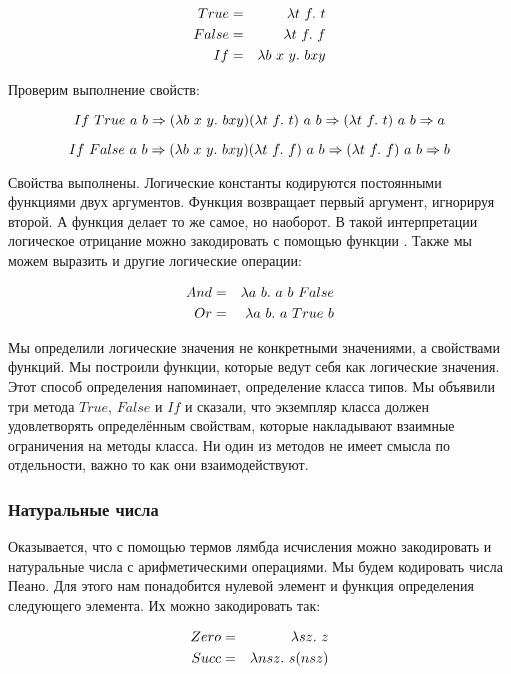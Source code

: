 \begin{eqnarray*}
True  &=& \lambda t\ f .\  t \\
False &=& \lambda t\ f .\  f \\
If    &=& \lambda b\ x\ y .\  b x y \\
\end{eqnarray*}

Проверим выполнение свойств:

\[If\ True\ a\ b \Rightarrow (\lambda b \ x \ y .\  b x y) (\lambda t\ f .\  t)\ a\ b 
    \Rightarrow (\lambda t\ f .\  t)\ a\ b \Rightarrow a\]

\[If\ False\ a\ b \Rightarrow (\lambda b \ x \ y .\  b x y) (\lambda t\ f .\  f)\ a\ b 
    \Rightarrow (\lambda t\ f .\  f)\ a\ b \Rightarrow b\]

Свойства выполнены. Логические константы кодируются постоянными
функциями двух аргументов. Функция  возвращает первый аргумент,
игнорируя второй. А функция  делает то же самое, но наоборот.
В такой интерпретации логическое отрицание можно закодировать с помощью
функции . Также мы можем выразить и другие логические операции:

\begin{eqnarray*}
And  &=& \lambda a\ b .\  a\ b\ False \\
Or   &=& \lambda a\ b .\  a\ True\ b \\
\end{eqnarray*}

Мы определили логические значения не конкретными значениями, а
свойствами функций. Мы построили функции, которые ведут себя как
логические значения. Этот способ определения напоминает, определение
класса типов. Мы объявили три метода $True$, $False$ и $If$ и сказали,
что экземпляр класса должен удовлетворять определённым свойствам,
которые накладывают взаимные ограничения на методы класса. Ни один из
методов не имеет смысла по отдельности, важно то как они
взаимодействуют.

\subsubsection{Натуральные числа}

Оказывается, что с помощью термов лямбда исчисления можно закодировать и
натуральные числа с арифметическими операциями. Мы будем кодировать
числа Пеано. Для этого нам понадобится нулевой элемент и функция
определения следующего элемента. Их можно закодировать так:

\begin{eqnarray*}
Zero &=& \lambda sz  .\  z \\
Succ &=& \lambda nsz .\  s(nsz) \\
\end{eqnarray*}

